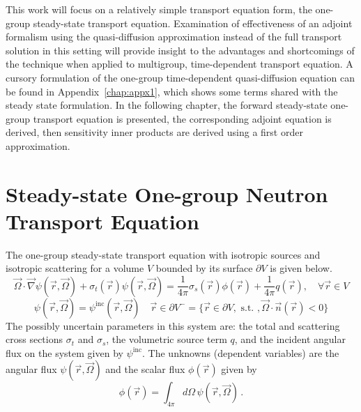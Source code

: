 \documentclass[12pt]{report}
\newcommand{\vr}{\vec{r}}
\newcommand{\vO}{\vec{\Omega}}
\newcommand{\grad}{\vec{\nabla}}
\newcommand{\sigt}{\sigma_t}
\newcommand{\sigs}{\sigma_s}
\begin{document}
This work will focus on a relatively simple transport equation form, the one-group steady-state transport equation. Examination of effectiveness of an adjoint formalism using the quasi-diffusion approximation instead of the full transport solution in this setting will provide insight to the advantages and shortcomings of the technique when applied to multigroup, time-dependent transport equation. A cursory formulation of the one-group time-dependent quasi-diffusion equation can be found in Appendix~\ref{chap:appx1}, which shows some terms shared with the steady state formulation. In the following chapter, the forward steady-state one-group transport equation is presented, the corresponding adjoint equation is derived, then sensitivity inner products are derived using a first order approximation. 

\section{Steady-state One-group Neutron Transport Equation}

The one-group steady-state transport equation with isotropic sources and isotropic scattering for a volume $V$ bounded by its surface $\partial V$ is given below.
\begin{equation}
\label{SS1GTE}
\vO \cdot \grad \psi(\vr,\vO) + \sigt(\vr) \psi(\vr,\vO) = \frac{1}{4 \pi} \sigs(\vr) \phi(\vr) + \frac{1}{4 \pi} q(\vr), \quad \forall \vr \in V
\end{equation}
\begin{equation}
\label{SS1GTE_bc}
\psi(\vr,\vO) = \psi^{\text{inc}}(\vr,\vO) \quad \vr \in \partial V^{-} = \{ \vr \in \partial V, \text{ s.t. }, \vO \cdot \vec{n}(\vr) < 0\}
\end{equation}
The possibly uncertain parameters in this system are: the total and scattering cross sections $\sigt$ and $\sigs$, the volumetric source term $q$, and the incident angular flux on the system given by $\psi^{\text{inc}}$. The unknowns (dependent variables) are the angular flux $\psi(\vr,\vO)$ and the scalar flux $\phi(\vr)$ given by
\[
\phi(\vr) = \int_{4\pi}d\Omega\,\psi(\vr,\vO) \,.
\]
\end{document}
